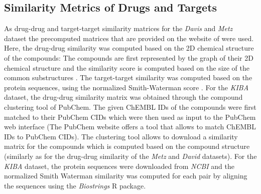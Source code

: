 \subsection{Similarity Metrics of Drugs and Targets}
As drug-drug and target-target similarity matrices for the \textit{Davis} and \textit{Metz} dataset the precomputed matrices that are provided on the website of \cite{pahikkala2014toward} were used. Here, the drug-drug similarity was computed based on the 2D chemical structure of the compounds: The compounds are first represented by the graph of their 2D chemical structure and the similarity score is computed based on the size of the common substructures \cite{bajusz2015tanimoto}. The target-target similarity was computed based on the protein sequences, using the normalized Smith-Waterman score \cite{yamanishi2008prediction} . For the \textit{KIBA} dataset, the drug-drug similarity matrix was obtained through the compound clustering tool of PubChem. The given ChEMBL IDs of the compounds were first matched to their PubChem CIDs which were then used as input to the PubChem web interface (The PubChem website offers a tool that allows to match ChEMBL IDs to PubChem CIDs). The clustering tool allows to download a similarity matrix for the compounds which is computed based on the compound structure (similarly as for the drug-drug similarity of the \textit{Metz} and \textit{David} datasets). For the \textit{KIBA} dataset, the protein sequences were downloaded from \textit{NCBI} and the normalized Smith Waterman similarity was computed for each pair by aligning the sequences using the \textit{Biostrings} R package.

